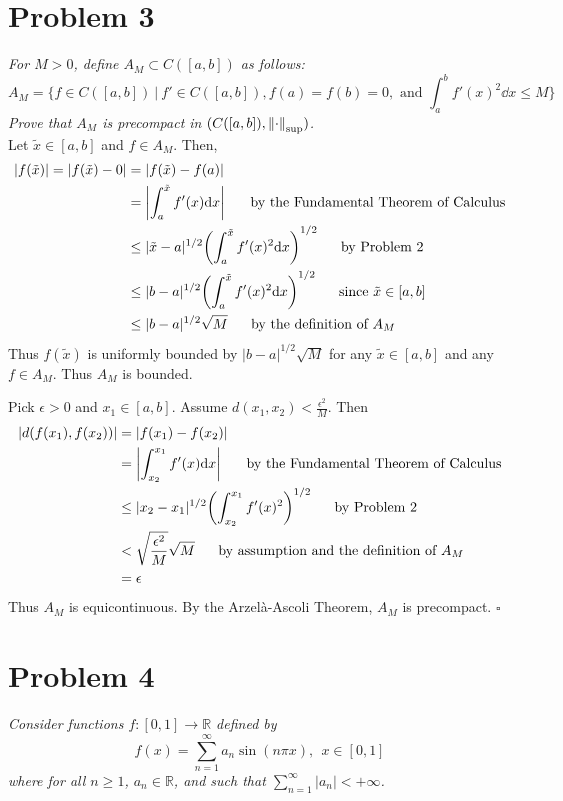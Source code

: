 \documentclass[12pt]{article}
\begin{document}
\section*{Problem 3}
\emph{For $M > 0$, define $A_M \subset C([a,b])$ as follows:}
\begin{equation*}
	A_M = \{f \in C([a,b])\ |\ f' \in C([a,b]), f(a) = f(b) = 0, \text{ and } \int_a^b f'(x)^2 \dd x \leq M\}
\end{equation*}
\emph{Prove that $A_M$ is precompact in $(C([a,b]), \norm{\cdot}_{\text{sup}})$.} \\

Let $\tilde{x} \in [a,b]$ and $f \in A_M$.  Then,
\begin{align*}
	|f(\tilde{x})| = |f(\tilde{x}) - 0| &= |f(\tilde{x}) - f(a)| \\
	&= \left|\int_a^{\tilde{x}} f'(x)\dd x\right|\ \ \ \ \ \text{by the Fundamental Theorem of Calculus} \\
	&\leq |\tilde{x} - a|^{1/2}\qty(\int_a^{\tilde{x}} f'(x)^2 \dd x)^{1/2} \ \ \ \ \ \text{by Problem 2} \\
	&\leq |b - a|^{1/2}\qty(\int_a^{\tilde{x}} f'(x)^2 \dd x)^{1/2}\ \ \ \ \ \text{since $\tilde{x}\in [a,b]$}\\
	&\leq |b - a|^{1/2}\sqrt{M}\ \ \ \ \ \text{by the definition of $A_M$}
\end{align*}
Thus $f(\tilde{x})$ is uniformly bounded by $|b-a|^{1/2}\sqrt{M}$ for any $\tilde{x} \in [a,b]$ and any $f \in A_M$.  Thus $A_M$ is bounded.

Pick $\epsilon > 0$ and $x_1 \in [a,b]$.  Assume $d(x_1, x_2) < \frac{\epsilon^2}{M}$.  Then
\begin{align*}
	|d(f(x_1), f(x_2))| &= |f(x_1) - f(x_2)| \\
	&= \left|\int_{x_2}^{x_1}f'(x) \dd x\right|\ \ \ \ \ \text{by the Fundamental Theorem of Calculus} \\
	&\leq |x_2 - x_1|^{1/2}\qty(\int_{x_2}^{x_1} f'(x)^2)^{1/2}\ \ \ \ \ \text{by Problem 2} \\
	&< \sqrt{\frac{\epsilon^2}{M}}\sqrt{M}\ \ \ \ \ \text{by assumption and the definition of $A_M$}\\
	&= \epsilon
\end{align*}
Thus $A_M$ is equicontinuous.  By the Arzel\`a-Ascoli Theorem, $A_M$ is precompact. \hfill $\square$

\section*{Problem 4}
\emph{Consider functions $f: [0,1] \rightarrow \mathbb{R}$ defined by}
\begin{equation}
	\label{form_1}
	f(x) = \sum_{n=1}^\infty a_n\sin(n\pi x),\ \ x \in [0,1]
\end{equation}
\emph{where for all $n \geq 1$, $a_n \in \mathbb{R}$, and such that $\sum_{n=1}^\infty |a_n| < +\infty$.}
\end{document}
